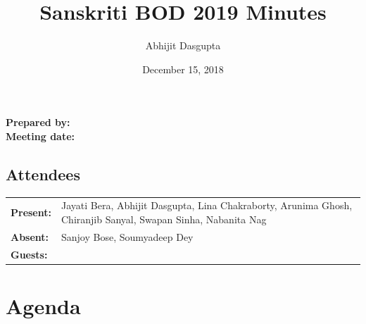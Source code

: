 \documentclass[12pt,]{article}
\title{Sanskriti BOD 2019 Minutes}
\author{Abhijit Dasgupta}
\date{December 15, 2018}
\makeatletter
\renewcommand{\maketitle}{\bgroup\setlength{\parindent}{0pt}
\begin{flushleft}
  \textbf{Prepared by:} \@author\\
  \textbf{Meeting date:} \@date
\end{flushleft}\egroup
}
\makeatother
\begin{document}
\maketitle

\thispagestyle{style1}

{
\setcounter{tocdepth}{4}
\tableofcontents
}
\hypertarget{attendees}{%
\subsection{Attendees}\label{attendees}}

\begin{longtable}[]{@{}ll@{}}
\toprule
\endhead
\begin{minipage}[t]{0.09\columnwidth}\raggedright
\textbf{Present:}\strut
\end{minipage} & \begin{minipage}[t]{0.85\columnwidth}\raggedright
Jayati Bera, Abhijit Dasgupta, Lina Chakraborty, Arunima Ghosh,
Chiranjib Sanyal, Swapan Sinha, Nabanita Nag\strut
\end{minipage}\tabularnewline
\begin{minipage}[t]{0.09\columnwidth}\raggedright
\textbf{Absent:}\strut
\end{minipage} & \begin{minipage}[t]{0.85\columnwidth}\raggedright
Sanjoy Bose, Soumyadeep Dey\strut
\end{minipage}\tabularnewline
\begin{minipage}[t]{0.09\columnwidth}\raggedright
\textbf{Guests:}\strut
\end{minipage} & \begin{minipage}[t]{0.85\columnwidth}\raggedright
\strut
\end{minipage}\tabularnewline
\bottomrule
\end{longtable}

\newpage

\hypertarget{agenda}{%
\section{Agenda}\label{agenda}}
\end{document}
